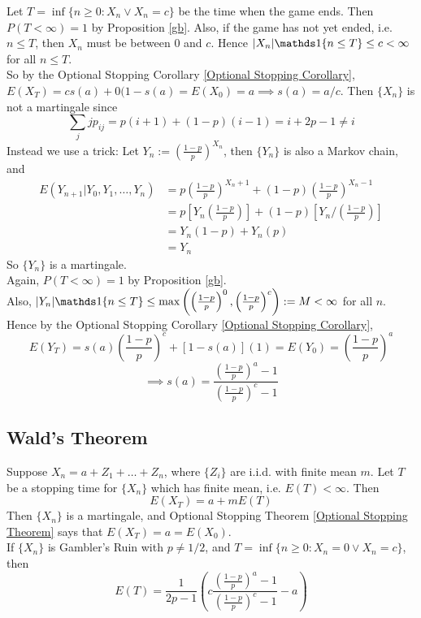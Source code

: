 \documentclass[11pt]{article}
\begin{document}
    \example[Gambler's Ruin problem - $p = 1/2$]
    Let $T = \inf\{ n \geq 0:X_n \lor X_n = c\}$ be the time when the game ends. Then $P(T<\infty) = 1$ by Proposition \ref{gb}. Also, if the game has not yet ended, i.e. $n \leq T$, then $X_n$ must be between $0$ and $c$. Hence $|X_n|\id{n \leq T}\leq c < \infty$ for all $n \leq T$.\\
    So by the Optional Stopping Corollary \ref{Optional Stopping Corollary}, $E(X_T) = cs(a) + 0(1-s(a) = E(X_0) = a \implies s(a) = a/c$.
    Then $\{X_n\}$ is not a martingale since 
    $$\sum_{j}jp_{ij} = p(i+1) + (1-p)(i-1) = i + 2p - 1 \neq i$$
    Instead we use a trick: Let $Y_n := \left( \frac{1-p}{p}  \right)^{X_n}$, then $\{Y_n\}$ is also a Markov chain, and
    \begin{align*}
    	E(Y_{n+1}|Y_0, Y_1, \hdots, Y_n) &= p\left( \frac{1-p}{p}\right)^{X_n + 1} + (1-p)\left( \frac{1-p}{p}   \right)^{X_n - 1} \\
    	&= p\left[ Y_n \left( \frac{1-p}{p}\right) \right] + (1-p)\left[ Y_n / \left( \frac{1-p}{p}\right) \right] \\
    	&= Y_n (1-p) + Y_n(p) \\
    	&= Y_n
    \end{align*}
    So $\{Y_n\}$ is a martingale.\\
    Again, $P(T<\infty) = 1$ by Proposition \ref{gb}. \\
    Also, $|Y_n|\id{n\leq T} \leq \max\left(  \left( \frac{1-p}{p}\right)^0, \left( \frac{1-p}{p}\right)^c \right) := M < \infty$ for all $n$. Hence by the Optional Stopping Corollary \ref{Optional Stopping Corollary}, $$E(Y_T) = s(a)\left( \frac{1-p}{p}\right)^c + [1-s(a)](1) = E(Y_0) = \left( \frac{1-p}{p}\right)^a$$
    $$\implies s(a) = \frac{\left( \frac{1-p}{p}\right)^a-1}{\left( \frac{1-p}{p}\right)^c - 1}$$
    \subsection{Wald's Theorem}
    Suppose $X_n = a + Z_1 + \hdots + Z_n$, where $\{Z_i\}$ are i.i.d. with finite mean $m$. Let $T$ be a stopping time for $\{X_n\}$ which has finite mean, i.e. $E(T) < \infty$. Then
    $$E(X_T) = a + mE(T)$$
    \property[Special case: $m = 0$]
    Then $\{X_n\}$ is a martingale, and Optional Stopping Theorem \ref{Optional Stopping Theorem} says that $E(X_T) = a = E(X_0)$. \\
    \corollary If $\{X_n\}$ is Gambler's Ruin with $p \neq 1/2$, and $T = \inf\{n \geq 0: X_n = 0 \lor X_n = c\}$, then
    $$E(T) = \frac{1}{2p-1}\left( c \frac{\left( \frac{1-p}{p}\right)^a - 1}{\left( \frac{1-p}{p}\right)^c - 1}-a\right)$$
    
\end{document}
